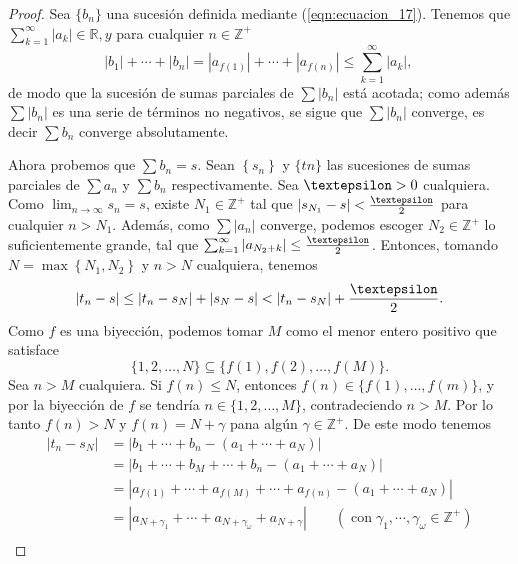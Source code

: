\begin{proof}
  Sea $\{b_n\}$ una sucesión definida mediante (\ref{eqn:ecuacion_17}). Tenemos que $\sum_{k=1}^{\infty}\left|a_{k}\right| \in \mathbb{R}, y$ para cualquier $n \in \mathbb{Z}^{+}$
  $$
  \left|b_{1}\right|+\cdots+\left|b_{n}\right|=\left|a_{f(1)}\right|+\cdots+\left|a_{f(n)}\right| \leq \sum_{k=1}^{\infty}\left|a_{k}\right| \text {, }
  $$
  de modo que la sucesión de sumas parciales de $\sum\left|b_{n}\right|$ está acotada; como además $\sum\left|b_{n}\right|$ es una serie de términos no negativos, se sigue que $\sum\left|b_{n}\right|$ converge, es decir $\sum b_{n}$ converge absolutamente.

  Ahora probemos que $\sum b_{n}=s$. Sean $\left\{s_{n}\right\}$ y $\{tn\}$ las sucesiones de sumas parciales de $\sum a_{n}$ y $\sum b_{n}$ respectivamente. Sea $\text{\textepsilon}>0$ cualquiera. Como $\lim _{n \rightarrow \infty} s_{n}=s$, existe $N_{1} \in \mathbb{Z}^{+}$ tal que $\left|s_{N_{1}}-s\right|<\frac{\text{\textepsilon}}{2}$ para cualquier $n > N_{1}$. Además, como $\sum\left|a_{n}\right|$ converge, podemos escoger $N_{2} \in \mathbb{Z}^{+}$ lo suficientemente grande, tal que $\sum_{k=1}^{\infty}\left|a_{N_{2}+k}\right| \leq \frac{\text{\textepsilon}}{2}$. Entonces, tomando $N=\operatorname{max}\left\{N_{1}, N_{2}\right\}$ y $n>N$ cualquiera, tenemos
  $$
  \left|t_{n}-s\right| \leq\left|t_{n}-s_{N}\right|+\left|s_{N}-s\right|<\left|t_{n}-s_{N}\right|+\frac{\text{\textepsilon}}{2} .
  $$
  Como $f$ es una biyección, podemos tomar $M$ como el menor entero positivo que satisface 
  $$\{1, 2, \ldots, N\} \subseteq\{f(1), f(2), \ldots, f(M)\}.$$
  Sea $n>M$ cualquiera. Si $f(n) \leq N$, entonces $f(n) \in\{f(1), \ldots, f(m)\}$, y por la biyección de $f$ se tendría $n \in\{1, 2, \ldots, M\}$, contradeciendo $n>M$. Por lo tanto $f(n)>N$ y $f(n)=N+\gamma$ pana algún $\gamma \in \mathbb{Z}^{+}$. De este modo tenemos
  $$
  \begin{aligned}
  \left|t_{n}-s_{N}\right| & =\left|b_{1}+\cdots+b_{n}-\left(a_{1}+\cdots+a_{N}\right)\right| \\
  & =\left|b_{1}+\cdots+b_{M}+\cdots+b_{n}-\left(a_{1}+\cdots+a_{N}\right)\right| \\
  & =\left|a_{f(1)}+\cdots+a_{f(M)}+\cdots+a_{f(n)}-\left(a_{1}+\cdots+a_{N}\right)\right| \\
  & =\left|a_{N+\gamma_{1}}+\cdots+a_{N+\gamma_{\omega}}+a_{N+\gamma}\right|\quad\quad\left(\operatorname{con} \gamma_{1}, \cdots, \gamma_{\omega} \in \mathbb{Z}^{+}\right) \\

\end{aligned}$$
\end{proof}
